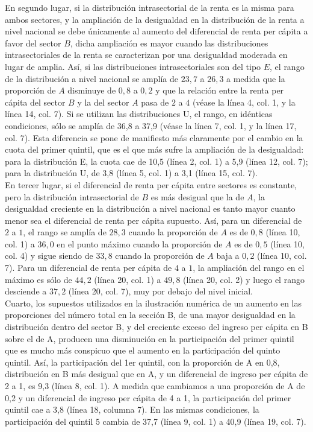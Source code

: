 En segundo lugar, si la distribución intrasectorial de la renta es la misma para ambos sectores, y la ampliación de la desigualdad en la distribución de la renta a nivel nacional se debe únicamente al aumento del diferencial de renta per cápita a favor del sector $B$, dicha ampliación es mayor cuando las distribuciones intrasectoriales de la renta se caracterizan por una desigualdad moderada en lugar de amplia. Así, si las distribuciones intrasectoriales son del tipo $E$, el rango de la distribución a nivel nacional se amplía de $23,7$ a $26,3$ a medida que la proporción de $A$ disminuye de $0,8$ a $0,2$ y que la relación entre la renta per cápita del sector $B$ y la del sector $A$ pasa de $2$ a $4$ (véase la línea 4, col. 1, y la línea 14, col. 7). Si se utilizan las distribuciones U, el rango, en idénticas condiciones, sólo se amplía de 36,8 a 37,9 (véase la línea 7, col. 1, y la línea 17, col. 7). Esta diferencia se pone de manifiesto más claramente por el cambio en la cuota del primer quintil, que es el que más sufre la ampliación de la desigualdad: para la distribución E, la cuota cae de 10,5 (línea 2, col. 1) a 5,9 (línea 12, col. 7); para la distribución U, de 3,8 (línea 5, col. 1) a 3,1 (línea 15, col. 7).\\

En tercer lugar, si el diferencial de renta per cápita entre sectores es constante, pero la distribución intrasectorial de $B$ es más desigual que la de $A$, la desigualdad creciente en la distribución a nivel nacional es tanto mayor cuanto menor sea el diferencial de renta per cápita supuesto. Así, para un diferencial de $2$ a $1$, el rango se amplía de $28,3$ cuando la proporción de $A$ es de $0,8$ (línea 10, col. 1) a $36,0$ en el punto máximo cuando la proporción de $A$ es de $0,5$ (línea 10, col. 4) y sigue siendo de $33,8$ cuando la proporción de $A$ baja a $0,2$ (línea 10, col. 7). Para un diferencial de renta per cápita de $4$ a $1$, la ampliación del rango en el máximo es sólo de $44,2$ (línea 20, col. 1) a $49,8$ (línea 20, col. 2) y luego el rango desciende a $37,2$ (línea 20, col. 7), muy por debajo del nivel inicial.\\

Cuarto, los supuestos utilizados en la ilustración numérica de un aumento en las proporciones del número total en la sección B, de una mayor desigualdad en la distribución dentro del sector B, y del creciente exceso del ingreso per cápita en B sobre el de A, producen una disminución en la participación del primer quintil que es mucho más conspicuo que el aumento en la participación del quinto quintil. Así, la participación del 1er quintil, con la proporción de A en 0,8, distribución en B más desigual que en A, y un diferencial de ingreso per cápita de 2 a 1, es 9,3 (línea 8, col. 1). A medida que cambiamos a una proporción de A de 0,2 y un diferencial de ingreso per cápita de 4 a 1, la participación del primer quintil cae a 3,8 (línea 18, columna 7). En las mismas condiciones, la participación del quintil 5 cambia de 37,7 (línea 9, col. 1) a 40,9 (línea 19, col. 7).\\

